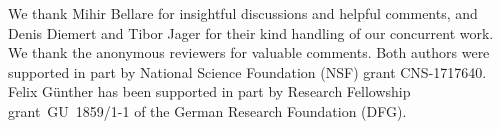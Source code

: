 We thank Mihir Bellare for insightful discussions and helpful comments,
and Denis Diemert and Tibor Jager for their kind handling of our concurrent work.
We thank the anonymous reviewers for valuable comments.
Both authors were supported in part by National Science Foundation (NSF) grant CNS-1717640.
Felix G{\"u}nther has been supported in part by Research Fellowship grant~\mbox{GU~1859/1-1} of the German Research Foundation (DFG).
